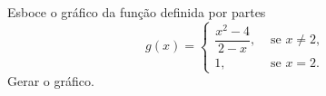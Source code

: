 \begin{example}
  Esboce o gráfico da função definida por partes
  \[
    g(x) = \begin{cases}
      \dfrac{x^2-4}{2-x}, & \text{ se } x \neq 2, \\
      1,                  & \text{ se } x =    2.
    \end{cases}
  \]
  {\large \color{red} Gerar o gráfico.}
\end{example}

